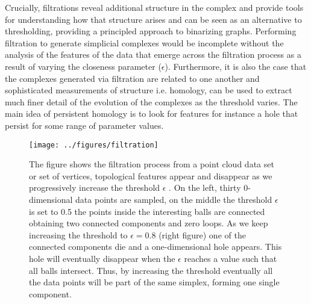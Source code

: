 \documentclass[onecollarge,runningheads]{svjour2}
\begin{document}
Crucially, filtrations reveal additional structure in the complex and provide tools for understanding how that structure arises and can be seen as an alternative to thresholding, providing a principled approach to binarizing graphs. Performing filtration to generate simplicial complexes would be incomplete without the analysis of the features of the data that emerge across the filtration process as a result of varying the closeness parameter ($\epsilon$). Furthermore, it is also the case that the complexes generated via filtration are related to one another and sophisticated measurements of structure i.e. homology, can be used to extract much finer detail of the evolution of the complexes as the threshold varies.
The main idea of persistent homology is to look for features for instance a hole that persist for some range of parameter values.


\begin{figure}[h]
        \centering
        \texttt{[image: ../figures/filtration]}
        \caption{The figure shows the filtration process from a point cloud data set or set of vertices, topological features appear and disappear as we progressively increase the threshold $\epsilon$ \cite{fasy2014confidence}. On the left, thirty 0-dimensional data points are sampled, on the middle the threshold $\epsilon$ is set to 0.5 the points inside the interesting balls are connected obtaining two connected components and zero loops. As we keep increasing the threshold to $\epsilon = 0.8$ (right figure) one of the connected components die and a one-dimensional hole appears. This hole will eventually disappear when the $\epsilon$ reaches a value such that all balls intersect. Thus, by increasing the threshold eventually all the data points will be part of the same simplex, forming one single component.}
\label{fig:whyweneedfiltration}
\end{figure}
\end{document}
